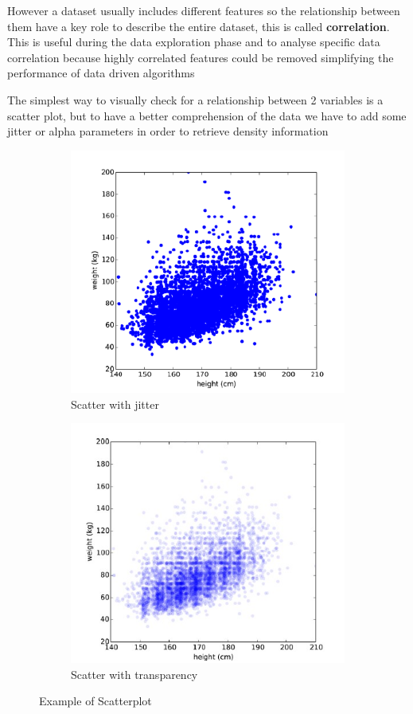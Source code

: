 However a dataset usually includes different features so the relationship between them have a key role to describe the entire dataset, this is called \textbf{correlation}. This is useful during the data exploration phase and to analyse specific data correlation because highly correlated features could be removed simplifying the performance of data driven algorithms

The simplest way to visually check for a relationship between 2 variables is a scatter plot, but to have a better comprehension  of the data we have to add some jitter or alpha parameters in order to retrieve density information

\begin{figure}[H]
    \begin{subfigure}{.5\textwidth}
        \centering
        \includegraphics[width=.6\linewidth]{images/DataExplVis/Scatter1.png}
        \caption{Scatter with jitter}
        \label{fig:sub1}
    \end{subfigure}
    \begin{subfigure}{.5 \textwidth}
        \centering
        \includegraphics[width=.6\linewidth]{images/DataExplVis/Scatter2.png}
        \caption{Scatter with transparency}
        \label{fig:sub1}
    \end{subfigure}
    \caption{Example of Scatterplot}
\end{figure}

